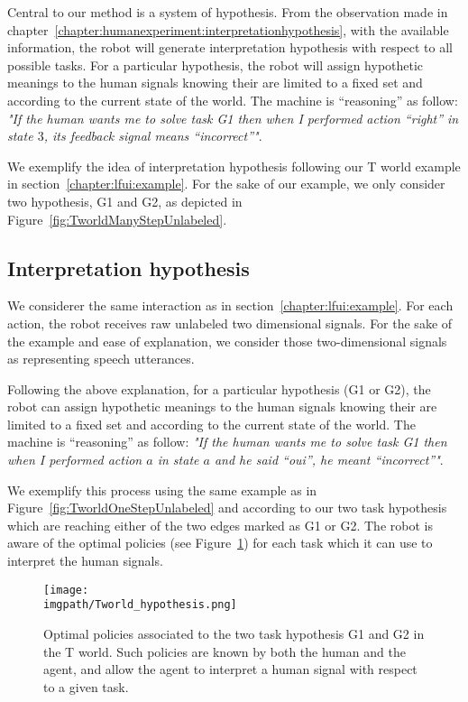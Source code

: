 Central to our method is a system of hypothesis. From the observation made in chapter~\ref{chapter:humanexperiment:interpretationhypothesis}, with the available information, the robot will generate interpretation hypothesis with respect to all possible tasks. For a particular hypothesis, the robot will assign hypothetic meanings to the human signals knowing their are limited to a fixed set and according to the current state of the world. The machine is ``reasoning'' as follow: \emph{"If the human wants me to solve task G1 then when I performed action ``right'' in state $3$, its feedback signal means ``incorrect''"}. 

We exemplify the idea of interpretation hypothesis following our T world example in section~\ref{chapter:lfui:example}. For the sake of our example, we only consider two hypothesis, G1 and G2, as depicted in Figure~\ref{fig:TworldManyStepUnlabeled}.

\subsection{Interpretation hypothesis}

We considerer the same interaction as in section~\ref{chapter:lfui:example}. For each action, the robot receives raw unlabeled two dimensional signals. For the sake of the example and ease of explanation, we consider those two-dimensional signals as representing speech utterances.

Following the above explanation, for a particular hypothesis (G1 or G2), the robot can assign hypothetic meanings to the human signals knowing their are limited to a fixed set and according to the current state of the world. The machine is ``reasoning'' as follow: \emph{"If the human wants me to solve task G1 then when I performed action $a$ in state $a$ and he said ``oui'', he meant ``incorrect''"}. 

We exemplify this process using the same example as in Figure~\ref{fig:TworldOneStepUnlabeled} and according to our two task hypothesis which are reaching either of the two edges marked as G1 or G2. The robot is aware of the optimal policies (see Figure~\ref{fig:Twolrdpolicies}) for each task which it can use to interpret the human signals.

\begin{figure}[!ht]
  \centering
  \texttt{[image: \\imgpath/Tworld\_hypothesis.png]}
  \caption{Optimal policies associated to the two task hypothesis G1 and G2 in the T world. Such policies are known by both the human and the agent, and allow the agent to interpret a human signal with respect to a given task.}
  \label{fig:Twolrdpolicies}
\end{figure}


